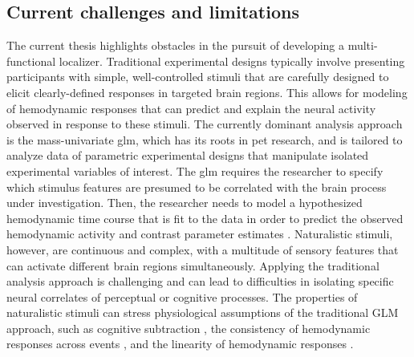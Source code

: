 \subsection{Current challenges and limitations}


%
The current thesis highlights obstacles in the pursuit of developing a
multi-functional localizer.
%
Traditional experimental designs typically involve presenting participants with
simple, well-controlled stimuli that are carefully designed to elicit
clearly-defined responses in targeted brain regions.
%
This allows for modeling of hemodynamic responses that can predict and explain
the neural activity observed in response to these stimuli.
%
The currently dominant analysis approach is the mass-univariate \ac{glm}, which
has its roots in \ac{pet} research, and is tailored to analyze data of
parametric experimental designs that manipulate isolated experimental variables
of interest.
%
The \ac{glm} requires the researcher to specify which stimulus features are
presumed to be correlated with the brain process under investigation.
%
Then, the researcher needs to model a hypothesized hemodynamic time course that
is fit to the data in order to predict the observed hemodynamic activity and
contrast parameter estimates \citep{friston1998event}.
%
Naturalistic stimuli, however, are continuous and complex, with a multitude of
sensory features that can activate different brain regions simultaneously.
%
Applying the traditional analysis approach is challenging and can lead to
difficulties in isolating specific neural correlates of perceptual or cognitive
processes.
%
The properties of naturalistic stimuli can stress physiological assumptions of
the traditional GLM approach, such as cognitive subtraction
\citep{friston1996trouble}, the consistency of hemodynamic responses across
events \citep[the rationale behind \textit{trial-averaging};
cf.][]{dale1997selective}, and the linearity of hemodynamic responses
\citep{cohen1997parametric, boynton1996linear, dale1999optimal}.  

